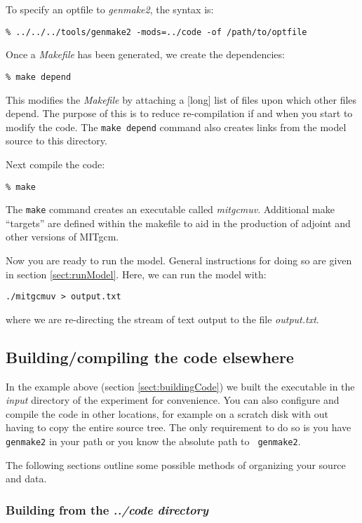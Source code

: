 To specify an optfile to {\em genmake2}, the syntax is:
\begin{verbatim}
% ../../../tools/genmake2 -mods=../code -of /path/to/optfile
\end{verbatim}

Once a {\em Makefile} has been generated, we create the dependencies:
\begin{verbatim}
% make depend
\end{verbatim}
This modifies the {\em Makefile} by attaching a [long] list of files
upon which other files depend. The purpose of this is to reduce
re-compilation if and when you start to modify the code. The {\tt make
  depend} command also creates links from the model source to this
directory.

Next compile the code:
\begin{verbatim}
% make
\end{verbatim}
The {\tt make} command creates an executable called \textit{mitgcmuv}.
Additional make ``targets'' are defined within the makefile to aid in
the production of adjoint and other versions of MITgcm.

Now you are ready to run the model. General instructions for doing so are
given in section \ref{sect:runModel}. Here, we can run the model with:
\begin{verbatim}
./mitgcmuv > output.txt
\end{verbatim}
where we are re-directing the stream of text output to the file {\em
output.txt}.


\subsection{Building/compiling the code elsewhere}

In the example above (section \ref{sect:buildingCode}) we built the
executable in the {\em input} directory of the experiment for
convenience. You can also configure and compile the code in other
locations, for example on a scratch disk with out having to copy the
entire source tree. The only requirement to do so is you have {\tt
  genmake2} in your path or you know the absolute path to {\tt
  genmake2}.

The following sections outline some possible methods of organizing
your source and data.

\subsubsection{Building from the {\em ../code directory}}

